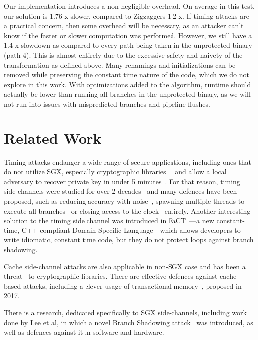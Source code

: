 \documentclass[sigplan, review]{acmart}
\begin{document}
Our implementation introduces a non-negligible overhead. On average in this test, our solution is 1.76 x slower, compared to Zigzaggers 1.2 x. If timing attacks are a practical concern, then some overhead will be necessary, as an attacker can't know if the faster or slower computation was performed. However, we still have a 1.4 x slowdown as compared to every path being taken in the unprotected binary (path 4). This is almost entirely due to the excessive safety and naivety of the transformation as defined above. Many renamings and initializations can be removed while preserving the constant time nature of the code, which we do not explore in this work. With optimizations added to the algorithm, runtime should actually be lower than running all branches in the unprotected binary, as we will not run into issues with mispredicted branches and pipeline flushes.

\section{Related Work}
Timing attacks endanger a wide range of secure applications, including ones that do not utilize SGX, especially cryptographic libraries~\cite{arnaud2013timing}~\cite{garcia2016constant} and allow a local adversary to recover private key in under 5 minutes~\cite{schwarz2017malware}. For that reason, timing side-channels were studied for over 2 decades~\cite{kocher1996timing} and many defences have been proposed, such as reducing accuracy with noise~\cite{hu1992reducing}, spawning multiple threads to execute all branches~\cite{devriese2010noninterference} or closing access to the clock~\cite{percival2005cache} entirely. Another interesting solution to the timing side channel was introduced in FaCT~\cite{cauligi2017fact}---a new constant-time, C++ compliant Domain Specific Language---which allows developers to write idiomatic, constant time code, but they do not protect loops against branch shadowing.

Cache side-channel attacks are also applicable in non-SGX case and has been a threat~\cite{osvik2006cache} to cryptographic libraries. There are effective defences against cache-based attacks, including a clever usage of transactional memory~\cite{gruss2017strong}, proposed in 2017.

There is a research, dedicated specifically to SGX side-channels, including work done by Lee et al, in which a novel Branch Shadowing attack~\cite{lee2016inferring} was introduced, as well as defences against it in software and hardware.
\end{document}
